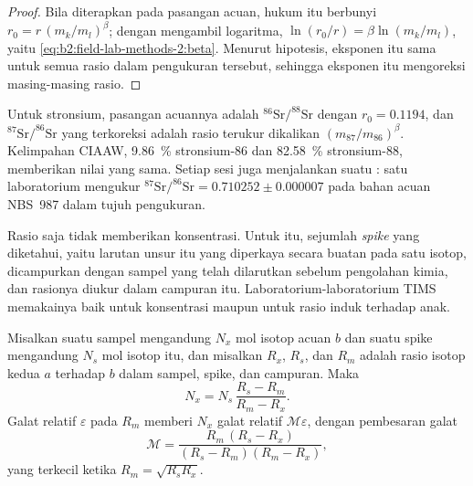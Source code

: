 \begin{proof}
Bila diterapkan pada pasangan acuan, hukum itu berbunyi $r_0 = r\,(m_k/m_l)^\beta$; dengan mengambil logaritma,
$\ln(r_0/r) = \beta\ln(m_k/m_l)$, yaitu \eqref{eq:b2:field-lab-methods-2:beta}. Menurut hipotesis, eksponen itu
sama untuk semua rasio dalam pengukuran tersebut, sehingga eksponen itu mengoreksi masing-masing rasio.
\end{proof}

Untuk stronsium, pasangan acuannya adalah $^{86}\mathrm{Sr}/^{88}\mathrm{Sr}$ dengan $r_0 = 0.1194$, dan
$^{87}\mathrm{Sr}/^{86}\mathrm{Sr}$ yang terkoreksi adalah rasio terukur dikalikan
$(m_{87}/m_{86})^\beta$. Kelimpahan CIAAW, \qty{9.86}{\percent} stronsium-86 dan
\qty{82.58}{\percent} stronsium-88, memberikan nilai yang sama. Setiap sesi juga menjalankan suatu : satu laboratorium mengukur $^{87}\mathrm{Sr}/^{86}\mathrm{Sr} = 0.710252 \pm
0.000007$ pada bahan acuan NBS~987 dalam tujuh pengukuran.

Rasio saja tidak memberikan konsentrasi. Untuk itu, sejumlah \emph{spike} yang diketahui, yaitu larutan
unsur itu yang diperkaya secara buatan pada satu isotop, dicampurkan dengan sampel yang telah dilarutkan sebelum
pengolahan kimia, dan rasionya diukur dalam campuran itu. Laboratorium-laboratorium TIMS memakainya baik untuk
konsentrasi maupun untuk rasio induk terhadap anak.

\begin{proposition}\label{prop:b2:field-lab-methods-2:id}
Misalkan suatu sampel mengandung $N_x$ mol isotop acuan $b$ dan suatu spike mengandung $N_s$ mol isotop itu, dan misalkan
$R_x$, $R_s$, dan $R_m$ adalah rasio isotop kedua $a$ terhadap $b$ dalam sampel, spike, dan
campuran. Maka
\begin{equation}
N_x = N_s\,\frac{R_s - R_m}{R_m - R_x} .
\label{eq:b2:field-lab-methods-2:id}
\end{equation}
Galat relatif $\varepsilon$ pada $R_m$ memberi $N_x$ galat relatif $\mathcal{M}\varepsilon$,
dengan pembesaran galat
\begin{equation}
\mathcal{M} = \frac{R_m\,(R_s - R_x)}{(R_s - R_m)(R_m - R_x)} ,
\label{eq:b2:field-lab-methods-2:mag}
\end{equation}
yang terkecil ketika $R_m = \sqrt{R_s R_x}$.
\end{proposition}

